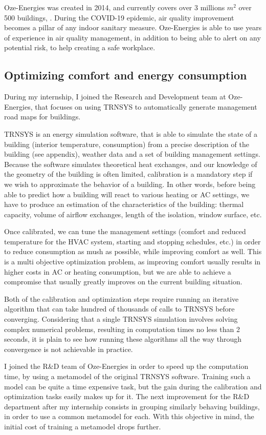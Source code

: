 \documentclass[12pt]{article}
\begin{document}
Oze-Energies was created in 2014, and currently covers over 3 millions $m^2$ over 500 buildings, \cite{}. During the COVID-19 epidemic, air quality improvement becomes a pillar of any indoor sanitary measure. Oze-Energies is able to use years of experience in air quality management, in addition to being able to alert on any potential risk, to help creating a safe workplace.

\subsection{Optimizing comfort and energy consumption}
During my internship, I joined the Research and Development team at Oze-Energies, that focuses on using TRNSYS to automatically generate management road maps for buildings.

TRNSYS is an energy simulation software, that is able to simulate the state of a building (interior temperature, consumption) from a precise description of the building (see appendix), weather data and a set of building management settings. Because the software simulates theoretical heat exchanges, and our knowledge of the geometry of the building is often limited, calibration is a mandatory step if we wish to approximate the behavior of a building. In other words, before being able to predict how a building will react to various heating or AC settings, we have to produce an estimation of the characteristics of the building: thermal capacity, volume of airflow exchanges, length of the isolation, window surface, etc.

Once calibrated, we can tune the management settings (comfort and reduced temperature for the HVAC system, starting and stopping schedules, etc.) in order to reduce consumption as mush as possible, while improving comfort as well. This is a multi objective optimization problem, as improving comfort usually results in higher costs in AC or heating consumption, but we are able to achieve a compromise that usually greatly improves on the current building situation.

Both of the calibration and optimization steps require running an iterative algorithm that can take hundred of thousands of calls to TRNSYS before converging. Considering that a single TRNSYS simulation involves solving complex numerical problems, resulting in computation times no less than 2 seconds, it is plain to see how running these algorithms all the way through convergence is not achievable in practice.

I joined the R\&D team of Oze-Energies in order to speed up the computation time, by using a metamodel of the original TRNSYS software. Training such a model can be quite a time expensive task, but the gain during the calibration and optimization tasks easily makes up for it. The next improvement for the R\&D department after my internship consists in grouping similarly behaving buildings, in order to use a common metamodel for each. With this objective in mind, the initial cost of training a metamodel drops further.
\end{document}
